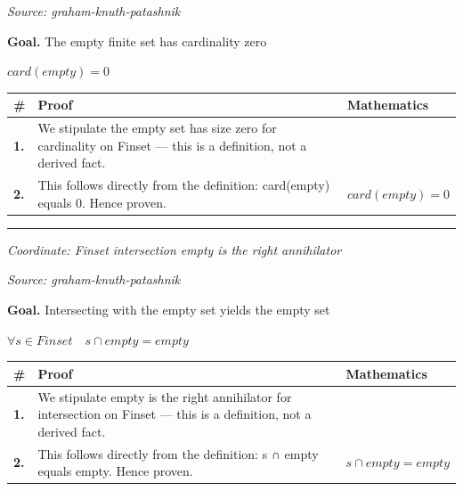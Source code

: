 \documentclass[11pt]{article}
\theoremstyle{definition}
\begin{document}
\smallskip\noindent\textit{Source: graham-knuth-patashnik}\par
\medskip
\noindent\textbf{Goal.} The empty finite set has cardinality zero\par
\noindent$\displaystyle card(empty) = 0$\par
\medskip
\noindent
\begin{tabular}{@{} >{\raggedright\arraybackslash}p{} >{\raggedright\arraybackslash}p{} >{\raggedleft\arraybackslash}p{} @{}}
\textbf{\#} & \textbf{Proof} & \textbf{Mathematics} \\
\midrule
\textbf{1.} & We stipulate the empty set has size zero for cardinality on Finset — this is a definition, not a derived fact. & \\[0.45em]
\textbf{2.} & This follows directly from the definition: card(empty) equals 0. Hence proven. & $\displaystyle card(empty) = 0$ \\[0.45em]
\bottomrule
\end{tabular}
\label{thm:Finset-cardinality-the_empty_set_has_size_zero}
\par\medskip\hrule
\bigskip
{}\par
\smallskip\noindent\textit{Coordinate: Finset \cdot intersection \cdot empty is the right annihilator}\par
\smallskip\noindent\textit{Source: graham-knuth-patashnik}\par
\medskip
\noindent\textbf{Goal.} Intersecting with the empty set yields the empty set\par
\noindent$\displaystyle \forall s \in Finset\quad s ∩ empty = empty$\par
\medskip
\noindent
\begin{tabular}{@{} >{\raggedright\arraybackslash}p{} >{\raggedright\arraybackslash}p{} >{\raggedleft\arraybackslash}p{} @{}}
\textbf{\#} & \textbf{Proof} & \textbf{Mathematics} \\
\midrule
\textbf{1.} & We stipulate empty is the right annihilator for intersection on Finset — this is a definition, not a derived fact. & \\[0.45em]
\textbf{2.} & This follows directly from the definition: s ∩ empty equals empty. Hence proven. & $\displaystyle s ∩ empty = empty$ \\[0.45em]
\bottomrule
\end{tabular}
\end{document}
